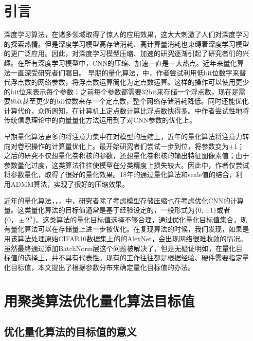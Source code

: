 \documentclass[ pdftex, oneside, master]{NJUthesis}
\begin{document}
\section{引言}
深度学习算法，在诸多领域取得了惊人的应用效果，这大大刺激了人们对深度学习的探索热情。但是深度学习模型高存储消耗、高计算量消耗也束缚着深度学习模型的更广泛应用。因此，对深度学习模型压缩、加速的研究逐渐引起了研究者们的兴趣。在所有深度学习模型中，CNN的压缩、加速一直是一大热点。近年来量化算法一直深受研究者们瞩目。
早期的量化算法，\cite{2014low}中，作者尝试利用低bit位数字来替代浮点数的网络参数，将浮点数运算简化为定点数运算。这样的操作可以使用更少的bit位来表示每个参数：之前每个参数都需要32bit来存储一个浮点数，现在是需要8bit甚至更少的bit位数来存一个定点数，整个网络存储消耗降低。同时还能优化计算代价，众所周知，在计算机上定点数计算比浮点数快得多。\cite{earlycompression2}中作者尝试性地将传统信息理论中的向量量化方法\cite{2011product}运用到了对CNN参数的优化上。

早期量化算法更多的将注意力集中在对模型的压缩上，近年的量化算法将注意力转向对卷积操作的计算量优化上。最开始研究者们尝试一步到位\cite{binary}，将参数变为$\pm1$；之后的研究不仅想量化卷积核的参数，还想量化卷积核的输出特征图像素值\cite{binary1}；由于参数量化过度，这类算法往往使模型在分类精度上损失较大。因此\cite{incremental}中，作者仅尝试将参数量化，取得了很好的量化效果。18年的\cite{extremely}通过量化算法和scale值的结合，利用ADMM算法，实现了很好的压缩效果。

近年的量化算法\cite{binary1}，\cite{binary}，\cite{ternary}，\cite{incremental}中，研究者除了考虑模型存储压缩也在考虑优化CNN的计算量。这类量化算法的目标值通常是基于经验设定的，一般形式为${\{0,\pm1\}}$或者 ${\{0， \pm2^n\}}$。这类算法的量化目标值选择不够合理，通过优化量化目标值集合，现有量化算法可以在存储量上进一步被优化。在复现\cite{binary}算法的时候，我们发现，如果是用该算法处理原始CIFAR10数据集上的的AlexNet\cite{alexnet}，会出现网络很难收敛的情况。虽然最终通过添加BatchNorm层这个问题被解决了，但是无疑证明如\cite{binary}，\cite{ternary}在量化目标值的选择上，并不具有代表性。现有的工作往往都是根据经验、硬件需要指定量化目标值，本文提出了根据参数分布来确定量化目标值的办法。


\section{用聚类算法优化量化算法目标值}

\subsection{优化量化算法的目标值的意义} \label{sec1}
\end{document}
